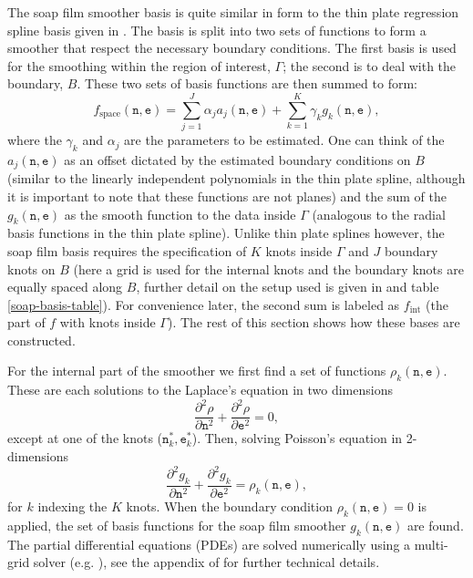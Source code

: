 The soap film smoother basis is quite similar in form to the thin plate regression spline basis given in . The basis is split into two sets of functions to form a smoother that respect the necessary boundary conditions. The first basis is used for the smoothing within the region of interest, $\Gamma$; the second is to deal with the boundary, $B$. These two sets of basis functions are then summed to form:
\begin{equation*}
f_\text{space}(\texttt{n},\texttt{e})=\sum_{j=1}^J \alpha_j a_j(\texttt{n},\texttt{e}) + \sum_{k=1}^K \gamma_k g_k(\texttt{n},\texttt{e}),
\end{equation*}
where the $\gamma_k$ and $\alpha_j$ are the parameters to be estimated. One can think of the $a_j(\texttt{n},\texttt{e})$ as an offset dictated by the estimated boundary conditions on $B$ (similar to the linearly independent polynomials in the thin plate spline, although it is important to note that these functions are not planes) and the sum of the $g_k(\texttt{n},\texttt{e})$ as the smooth function to the data inside $\Gamma$ (analogous to the radial basis functions in the thin plate spline). Unlike thin plate splines however, the soap film basis requires the specification of $K$ knots inside $\Gamma$ and $J$ boundary knots on $B$ (here a grid is used for the internal knots and the boundary knots are equally spaced along $B$, further detail on the setup used is given in  and table \ref{soap-basis-table}). For convenience later, the second sum is labeled as $f_\text{int}$ (the part of $f$ with knots inside $\Gamma$). The rest of this section shows how these bases are constructed.

For the internal part of the smoother we first find a set of functions $\rho_k(\texttt{n},\texttt{e})$. These are each solutions to the Laplace's equation in two dimensions
$$
\frac{\partial^2\rho}{\partial \texttt{n}^2} + \frac{\partial^2\rho}{\partial \texttt{e}^2} = 0,
$$
except at one of the knots ($\texttt{n}^*_k,\texttt{e}^*_k$). Then, solving Poisson's equation in 2-dimensions
\begin{equation}
\frac{\partial^2 g_k}{\partial \texttt{n}^2} + \frac{\partial^2 g_k}{\partial \texttt{e}^2} = \rho_k(\texttt{n},\texttt{e}),
\label{soap-poisson}
\end{equation}
for $k$ indexing the $K$ knots. When the boundary condition $\rho_k(\texttt{n},\texttt{e})=0$ is applied, the set of basis functions for the soap film smoother $g_k(\texttt{n},\texttt{e})$ are found.  The partial differential equations (PDEs) are solved numerically using a multi-grid solver (e.g. \cite[pp. 862-880]{press1992numerical}), see the appendix of \cite{soap} for further technical details.

